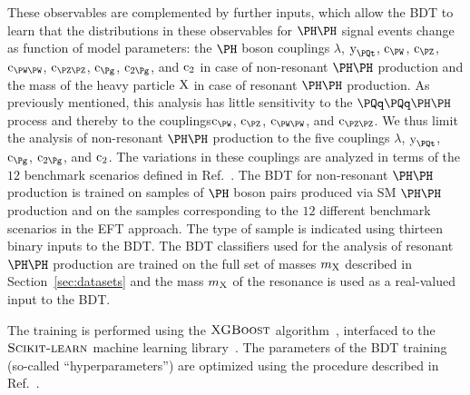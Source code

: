 These observables are complemented by further inputs, which allow the BDT to learn that the distributions in these observables for $\HH$ signal events
change as function of model parameters:
the $\PHiggs$ boson couplings $\lambda$, $\yt$, $\cW$, $\cZ$, $\cWW$, $\cZZ$, $\cg$, $\cgg$, and $\text{c}_{2}$ in case of non-resonant $\HH$ production
and the mass of the heavy particle $\textrm{X}$ in case of resonant $\HH$ production.
As previously mentioned, this analysis has little sensitivity to the $\qqHH$ process and thereby to the couplings$\cW$, $\cZ$, $\cWW$, and $\cZZ$.
We thus limit the analysis of non-resonant $\HH$ production to the five couplings $\lambda$, $\yt$, $\cg$, $\cgg$, and $\text{c}_{2}$.
The variations in these couplings are analyzed in terms of the $12$ benchmark scenarios defined in Ref.~\cite{Carvalho:2015ttv}.
The BDT for non-resonant $\HH$ production is trained on samples of $\PHiggs$ boson pairs produced via SM $\HH$ production
and on the samples corresponding to the $12$ different benchmark scenarios in the EFT approach.
The type of sample is indicated using thirteen binary inputs to the BDT.
The BDT classifiers used for the analysis of resonant $\HH$ production are trained on the full set of masses $m_{\textrm{X}}$ described in Section~\ref{sec:datasets}
and the mass $m_{\textrm{X}}$ of the resonance is used as a real-valued input to the BDT.

The training is performed using the $\textsc{XGBoost}$ algorithm~\cite{Chen:2016btl},
interfaced to the $\textsc{Scikit-learn}$ machine learning library~\cite{scikit-learn}.
The parameters of the BDT training (so-called ``hyperparameters'') are optimized using the procedure described in Ref.~\cite{Tani:2020dyi}.




